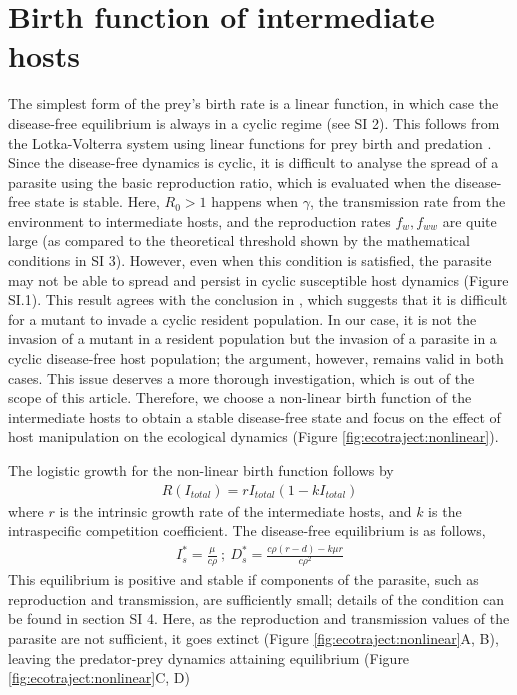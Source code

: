\documentclass[a4paper]{scrartcl}
\begin{document}
\section*{Birth function of intermediate hosts}

The simplest form of the prey's birth rate is a linear function, in which case the disease-free equilibrium is always in a cyclic regime (see SI 2).
This follows from the Lotka-Volterra system using linear functions for prey birth and predation \citep{Lotka1920}.
Since the disease-free dynamics is cyclic, it is difficult to analyse the spread of a parasite using the basic reproduction ratio, which is evaluated when the disease-free state is stable. 
Here,  $R_0 > 1$  happens when $\gamma$, the transmission rate from the environment to intermediate hosts, and the reproduction rates $f_w, f_{ww}$ are quite large (as compared to the theoretical threshold shown by the mathematical conditions in SI 3). 
However, even when this condition is satisfied, the parasite may not be able to spread and persist in cyclic susceptible host dynamics (Figure SI.1). 
This result agrees with the conclusion in \citep{Ripa:Evol:2013}, which suggests that it is difficult for a mutant to invade a cyclic resident population. 
In our case, it is not the invasion of a mutant in a resident population but the invasion of a parasite in a cyclic disease-free host population; the argument, however, remains valid in both cases. 
This issue deserves a more thorough investigation, which is out of the scope of this article. 
Therefore, we choose a non-linear birth function of the intermediate hosts to obtain a stable disease-free state and focus on the effect of host manipulation on the ecological dynamics (Figure \ref{fig:ecotraject:nonlinear}). 

The logistic growth for the non-linear birth function follows by 
%
\begin{align*}
R(I_{total}) = r I_{total} (1 - k I_{total}) 
\end{align*}
%
where $r$ is the intrinsic growth rate of the intermediate hosts, and $k$ is the intraspecific competition coefficient. 
The disease-free equilibrium is as follows,
%
\begin{align*}
I_s^* = \frac{\mu}{c \rho } \ ;\  D_s^* = \frac{c \rho  (r-d) - k \mu  r}{c \rho ^2}
\end{align*}
%
This equilibrium is positive and stable if components of the parasite, such as reproduction and transmission, are sufficiently small; details of the condition can be found in section SI 4. 
Here, as the reproduction and transmission values of the parasite are not sufficient, it goes extinct (Figure \ref{fig:ecotraject:nonlinear}A, B), leaving the predator-prey dynamics attaining equilibrium (Figure \ref{fig:ecotraject:nonlinear}C, D)
\end{document}

